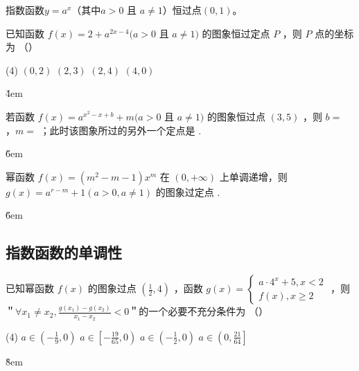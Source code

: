 \begin{theorem}[指数函数恒过定点]
    指数函数$y=a^x$（其中$a>0$ 且 $a \neq 1$）恒过点$(0,1)$。
\end{theorem}

\begin{example}
    已知函数 $f(x)=2+a^{2 x-4}(a>0$ 且 $a \neq 1)$ 的图象恒过定点 $P$ ，则 $P$ 点的坐标为 （\qquad）
    \begin{tasks}(4)
        \task $(0,2)$
        \task $(2,3)$
        \task $(2,4)$
        \task $(4,0)$
    \end{tasks}
\end{example}

\v{4em}

\begin{example}
    若函数 $f(x)=a^{x^2-x+b}+m(a>0$ 且 $a \neq 1)$ 的图象恒过点 $(3,5)$ ，则 $b=$ \underline{\qquad}，$m=$ \underline{\qquad}；此时该图象所过的另外一个定点是 \underline{\qquad}.
\end{example}

\v{6em}

\begin{example}
    幂函数 $f(x)=\left(m^2-m-1\right) x^m$ 在 $(0,+\infty)$ 上单调递增，则 $g(x)=a^{r-m}+1(a>0, a \neq 1)$ 的图象过定点 \underline{\qquad}.
\end{example}

\v{6em}

\subsection{指数函数的单调性}

\begin{example}
    已知幂函数 $f(x)$ 的图象过点 $\left(\frac{1}{2}, 4\right)$ ，函数 $g(x)=\left\{\begin{array}{c}a \cdot 4^x+5, x<2 \\ f(x), x \geq 2\end{array}\right.$ ，则＂$\forall x_1 \neq x_2, \frac{g\left(x_1\right)-g\left(x_2\right)}{x_1-x_2}<0$＂的一个必要不充分条件为 （\qquad）
    \begin{tasks}(4)
        \task $a \in\left(-\frac{1}{9}, 0\right)$
        \task $a \in\left[-\frac{19}{65}, 0\right)$
                    \task $a \in\left(-\frac{1}{2}, 0\right)$
                    \task $a \in\left(0, \frac{21}{64}\right]$
    \end{tasks}
\end{example}

\v{8em}

